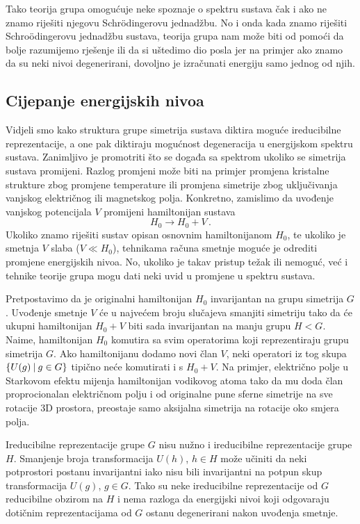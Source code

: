 Tako teorija grupa omogućuje neke spoznaje o spektru sustava
čak i ako ne znamo riješiti njegovu Schr\"{o}dingerovu jednadžbu.
No i onda kada znamo riješiti Schro\"{o}dingerovu
jednadžbu sustava, teorija grupa nam može biti od pomoći
da bolje razumijemo rješenje ili da si uštedimo dio posla jer
na primjer ako znamo da su neki nivoi degenerirani, dovoljno je izračunati
energiju samo jednog od njih.

\subsection*{Cijepanje energijskih nivoa}

Vidjeli smo kako struktura grupe simetrija sustava diktira moguće
ireducibilne reprezentacije, a one pak diktiraju mogućnost 
degeneracija u energijskom spektru sustava.
Zanimljivo je promotriti
što se događa sa spektrom ukoliko se simetrija sustava promijeni.
Razlog promjeni može biti na primjer promjena kristalne strukture
zbog promjene temperature ili promjena simetrije zbog uključivanja
vanjskog električnog ili magnetskog polja.
Konkretno, zamislimo da uvođenje vanjskog potencijala $V$  promijeni hamiltonijan
sustava
\begin{displaymath}
    H_0 \to  H_0 + V \,.
\end{displaymath}
Ukoliko znamo riješiti sustav opisan osnovnim hamiltonijanom $H_0$, te
ukoliko je smetnja $V$ slaba ($V\ll H_0$), tehnikama računa smetnje
moguće je  odrediti promjene energijskih nivoa. No, ukoliko je takav
pristup težak ili nemoguć, već i tehnike teorije grupa mogu dati neki uvid
u promjene u spektru sustava. 

Pretpostavimo da je originalni hamiltonijan $H_0$ invarijantan na
grupu simetrija $G$. Uvođenje smetnje $V$ će u najvećem broju
slučajeva smanjiti simetriju tako da će ukupni hamiltonijan $H_0 + V$ 
biti sada invarijantan na manju grupu $H<G$. Naime,
hamiltonijan $H_0$ komutira sa svim operatorima koji reprezentiraju
grupu simetrija $G$. Ako hamiltonijanu dodamo novi član $V$, neki operatori iz
tog skupa $\{U(g) \: | \: g\in G\}$ tipično neće komutirati i s $H_0 + V$.
Na primjer, električno polje u Starkovom efektu  mijenja hamiltonijan
vodikovog atoma tako da mu doda član proprocionalan električnom polju
i od originalne pune sferne simetrije na sve rotacije 3D prostora,
preostaje samo aksijalna simetrija na rotacije oko smjera polja.

Ireducibilne reprezentacije grupe $G$ nisu nužno i ireducibilne
reprezentacije grupe $H$. Smanjenje broja transformacija
$U(h)$, $h\in H$ može učiniti da neki potprostori postanu invarijantni
iako nisu bili invarijantni na potpun skup transformacija $U(g)$, $g\in G$.
Tako su neke ireducibilne reprezentacije od $G$ reducibilne obzirom na $H$
i nema razloga da energijski nivoi koji odgovaraju dotičnim reprezentacijama
od $G$ ostanu degenerirani nakon uvođenja smetnje.

